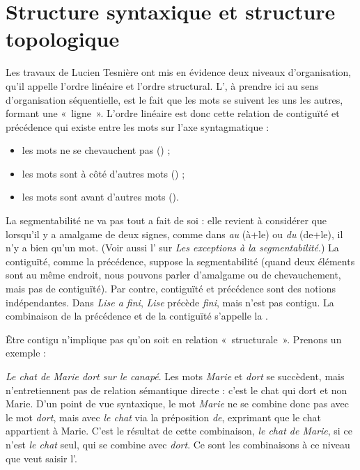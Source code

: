 \section{Structure syntaxique et structure topologique}\label{sec:3.2.6}

Les travaux de Lucien Tesnière ont mis en évidence deux niveaux d’organisation, qu’il appelle l’ordre linéaire et l’ordre structural. L’, à prendre ici au sens d’organisation séquentielle, est le fait que les mots se suivent les uns les autres, formant une «~ligne~». L’ordre linéaire est donc cette relation de contiguïté et précédence qui existe entre les mots sur l’axe syntagmatique :

\begin{itemize}
\item les mots ne se chevauchent pas () ;
\item les mots sont à côté d’autres mots () ;
\item les mots sont avant d’autres mots ().
\end{itemize}

La segmentabilité ne va pas tout a fait de soi : elle revient à considérer que lorsqu’il y a amalgame de deux signes, comme dans \textit{au} (à+le) ou \textit{du} (de+le), il n’y a bien qu’un mot. (Voir aussi l’ sur \textit{Les exceptions à la segmentabilité}.) La contiguïté, comme la précédence, suppose la segmentabilité (quand deux éléments sont au même endroit, nous pouvons parler d’amalgame ou de chevauchement, mais pas de contiguïté). Par contre, contiguïté et précédence sont des notions indépendantes. Dans \textit{Lise a fini}, \textit{Lise} précède \textit{fini}, mais n’est pas contigu. La combinaison de la précédence et de la contiguïté s’appelle la .

Être contigu n’implique pas qu’on soit en relation «~structurale~». Prenons un exemple :

\ea
\textit{{Le chat de Marie dort sur le canapé}}.
\z
Les mots \textit{Marie} et \textit{dort} se succèdent, mais n’entretiennent pas de relation sémantique directe : c’est le chat qui dort et non Marie. D’un point de vue syntaxique, le mot \textit{Marie} ne se combine donc pas avec le mot \textit{dort}, mais avec \textit{le chat} via la préposition \textit{de}, exprimant que le chat appartient à Marie. C’est le résultat de cette combinaison, \textit{le chat de Marie}, si ce n’est \textit{le chat} seul, qui se combine avec \textit{dort}. Ce sont les combinaisons à ce niveau que veut saisir l’.

